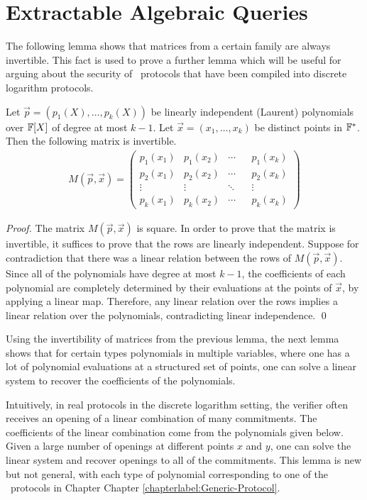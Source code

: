 \section{Extractable Algebraic Queries}\label{sec:extalgq}

The following lemma shows that matrices from a certain family are always invertible. This fact is used to prove a further lemma which will be useful for arguing about the security of \ILC\ protocols that have been compiled into discrete logarithm protocols.

\begin{lemma}\label{lem:matinv}
Let $\vec{p} = (p_1(X),\ldots,p_k(X))$ be linearly independent (Laurent) polynomials over $\mathbb{F}[X]$ of degree at most $k-1$. Let $\vec{x} = (x_1,\ldots,x_k)$ be distinct points in $\mathbb{F}^*$. Then the following matrix is invertible.
\begin{align*}
M(\vec{p},\vec{x}) =
\left(
\begin{array}{lllll}
p_1(x_1) & p_1(x_2) & \cdots & & p_1(x_k) \\
p_2(x_1) & p_2(x_2) & \cdots & & p_2(x_k) \\
\vdots & \vdots &  \ddots & & \vdots \\
p_k(x_1) & p_k(x_2) & \cdots & & p_k(x_k)
\end{array}
\right)
\end{align*}
\end{lemma}

\begin{proof}
The matrix $M(\vec{p},\vec{x})$ is square. In order to prove that the matrix is invertible, it suffices to prove that the rows are linearly independent. Suppose for contradiction that there was a linear relation between the rows of $M(\vec{p},\vec{x})$. Since all of the polynomials have degree at most $k-1$, the coefficients of each polynomial are completely determined by their evaluations at the points of $\vec{x}$, by applying a linear map. Therefore, any linear relation over the rows implies a linear relation over the polynomials, contradicting linear independence. \qed
\end{proof}

Using the invertibility of matrices from the previous lemma, the next lemma shows that for certain types polynomials in multiple variables, where one has a lot of polynomial evaluations at a structured set of points, one can solve a linear system to recover the coefficients of the polynomials.

Intuitively, in real protocols in the discrete logarithm setting, the verifier often receives an opening of a linear combination of many commitments. The coefficients of the linear combination come from the polynomials given below. Given a large number of openings at different points $x$ and $y$, one can solve the linear system and recover openings to all of the commitments. This lemma is new but not general, with each type of polynomial corresponding to one of the \ILC\ protocols in Chapter Chapter \ref{chapterlabel:Generic-Protocol}.

